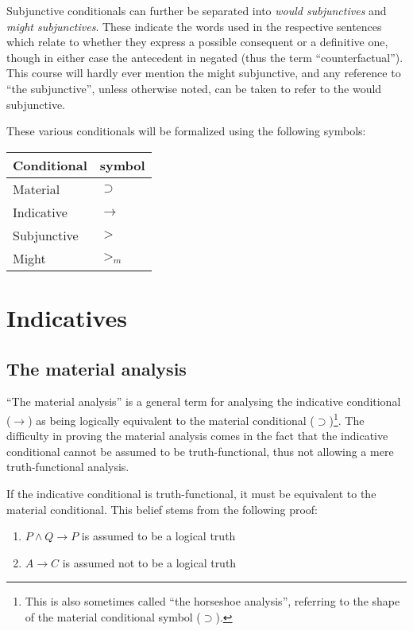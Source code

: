 \documentclass[12pt]{report}
\begin{document}
Subjunctive conditionals can further be separated into \emph{would subjunctives}
and \emph{might subjunctives}. These indicate the words used in the respective
sentences which relate to whether they express a possible consequent or a
definitive one, though in either case the antecedent in negated (thus the term
``counterfactual''). This course will hardly ever mention the might subjunctive,
and any reference to ``the subjunctive'', unless otherwise noted, can be taken
to refer to the would subjunctive.

These various conditionals will be formalized using the following symbols:
\begin{tabular}{l|l}
	Conditional & symbol\\
	\hline
	Material & $\supset$\\
	Indicative & $\rightarrow$\\
	Subjunctive & $>$\\
	Might & $>_m$\\
\end{tabular}

\part{Indicatives}
\chapter{The material analysis}

``The material analysis'' is a general term for analysing the indicative
conditional ($\rightarrow$) as being logically equivalent to the material
conditional ($\supset$)\footnote{This is also sometimes called ``the horseshoe
analysis'', referring to the shape of the material conditional symbol
($\supset$).}. The difficulty in proving the material analysis comes in the fact
that the indicative conditional cannot be assumed to be truth-functional, thus
not allowing a mere truth-functional analysis.

If the indicative conditional is truth-functional, it must be equivalent to the
material conditional. This belief stems from the following proof:
\begin{enumerate}
	\item
		$P \land Q \rightarrow P$ is assumed to be a logical truth 
	\item
		$A \rightarrow C$ is assumed not to be a logical truth
\end{enumerate}
\end{document}
